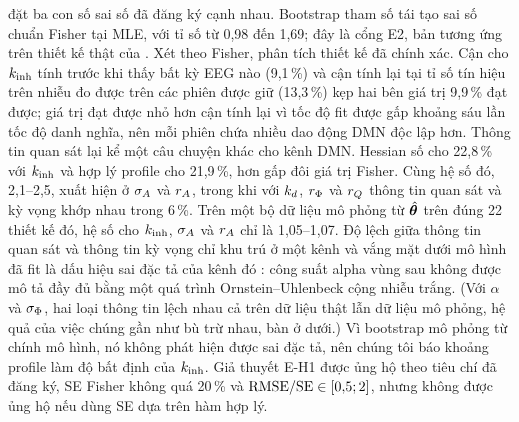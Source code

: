  đặt ba con số sai số đã đăng ký cạnh nhau. Bootstrap tham số \citep{Efron1993} tái tạo sai số chuẩn Fisher tại MLE, với tỉ số từ 0,98 đến 1,69; đây là cổng E2, bản tương ứng trên thiết kế thật của . Xét theo Fisher, phân tích thiết kế đã chính xác. Cận cho $k_{\mathrm{inh}}$ tính trước khi thấy bất kỳ EEG nào (9,1\,\%) và cận tính lại tại tỉ số tín hiệu trên nhiễu đo được trên các phiên được giữ (13,3\,\%) kẹp hai bên giá trị 9,9\,\% đạt được; giá trị đạt được nhỏ hơn cận tính lại vì tốc độ fit được gấp khoảng sáu lần tốc độ danh nghĩa, nên mỗi phiên chứa nhiều dao động DMN độc lập hơn. Thông tin quan sát lại kể một câu chuyện khác cho kênh DMN. Hessian số cho 22,8\,\% với $k_{\mathrm{inh}}$ và hợp lý profile cho 21,9\,\%, hơn gấp đôi giá trị Fisher. Cùng hệ số đó, 2,1--2,5, xuất hiện ở $\sigma_{A}$ và $r_{A}$, trong khi với $k_{d}$, $r_{\Phi}$ và $r_{Q}$ thông tin quan sát và kỳ vọng khớp nhau trong 6\,\%. Trên một bộ dữ liệu mô phỏng từ $\hat{\boldsymbol{\theta}}$ trên đúng 22 thiết kế đó, hệ số cho $k_{\mathrm{inh}}$, $\sigma_{A}$ và $r_{A}$ chỉ là 1,05--1,07. Độ lệch giữa thông tin quan sát và thông tin kỳ vọng chỉ khu trú ở một kênh và vắng mặt dưới mô hình đã fit là dấu hiệu sai đặc tả của kênh đó \citep{White1982}: công suất alpha vùng sau không được mô tả đầy đủ bằng một quá trình Ornstein--Uhlenbeck cộng nhiễu trắng. (Với $\alpha$ và $\sigma_{\Phi}$, hai loại thông tin lệch nhau cả trên dữ liệu thật lẫn dữ liệu mô phỏng, hệ quả của việc chúng gần như bù trừ nhau, bàn ở dưới.) Vì bootstrap mô phỏng từ chính mô hình, nó không phát hiện được sai đặc tả, nên chúng tôi báo khoảng profile làm độ bất định của $k_{\mathrm{inh}}$. Giả thuyết E-H1 được ủng hộ theo tiêu chí đã đăng ký, SE Fisher không quá 20\,\% và $\mathrm{RMSE}/\mathrm{SE}\in[0{,}5;2]$, nhưng không được ủng hộ nếu dùng SE dựa trên hàm hợp lý.

